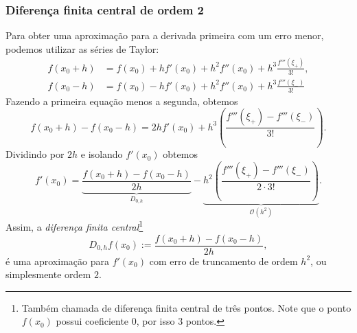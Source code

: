 \subsubsection{Diferença finita central de ordem 2}
Para obter uma aproximação para a derivada primeira com um erro menor, podemos utilizar as séries de Taylor:
\begin{eqnarray*}
    f(x_0+h) &= f(x_0) + hf'(x_0) + h^2f''(x_0) + h^3\frac{f'''(\xi_{+})}{3!},\\
    f(x_0-h) &= f(x_0) - hf'(x_0) + h^2f''(x_0) + h^3\frac{f'''(\xi_{-})}{3!}
\end{eqnarray*}
Fazendo a primeira equação menos a segunda, obtemos
\begin{equation*}
  f(x_0+h)-f(x_0-h) = 2hf'(x_0) + h^{3}\left(\frac{f'''(\xi_{+}) - f'''(\xi_{-})}{3!}\right).
\end{equation*}
Dividindo por $2h$ e isolando $f'(x_0)$ obtemos
\begin{equation*}
  f'(x_0) = \underbrace{\frac{f(x_0+h) - f(x_0-h)}{2h}}_{D_{0,h}} - \underbrace{h^2\left(\frac{f'''(\xi_+) - f'''(\xi_-)}{2\cdot 3!}\right)}_{\mathcal{O}(h^2)}.
\end{equation*}
Assim, a \emph{diferença finita central}\footnote{Também chamada de diferença finita central de três pontos. Note que o ponto $f(x_0)$ possui coeficiente $0$, por isso $3$ pontos.}
\begin{equation*}
  D_{0,h}f(x_0) := \frac{f(x_0+h)-f(x_0-h)}{2h},
\end{equation*}
é uma aproximação para $f'(x_0)$ com erro de truncamento de ordem $h^2$, ou simplesmente ordem $2$.

